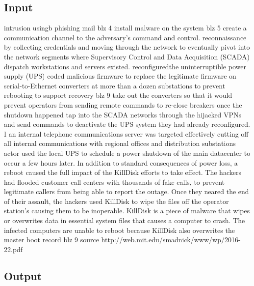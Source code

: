 \documentclass[11pt]{report}
\begin{document}
\subsection{Input}

intrusion usingb phishing mail blz  4
install malware on the system blz 5
create a communication channel to the adversary’s command and control.
reconnaissance by collecting credentials and moving through the network to eventually pivot into the network segments where Supervisory Control and Data Acquisition (SCADA) dispatch workstations and servers existed.
reconfiguredthe uninterruptible power supply (UPS)
coded malicious firmware to replace the legitimate firmware on serial-to-Ethernet converters at more than a dozen substations to prevent rebooting to support recovery blz 9
take out the converters so that it would prevent operators from sending remote commands to re-close breakers once the shutdown happened
tap into the SCADA networks through the hijacked VPNs and send commands to deactivate the UPS system they had already reconfigured. I
an internal telephone communications server was targeted effectively cutting off all internal communications with regional offices and distribution substations
actor used the local UPS to schedule a power shutdown of the main datacenter to occur a few hours later. In addition to standard consequences of power loss, a reboot caused the full impact of the KillDisk efforts to take effect.
The hackers had flooded customer call centers with thousands of fake calls, to prevent legitimate callers from being able to report the outage.
Once they neared the end of their assault, the hackers used KillDisk to wipe the files off the  operator station’s causing them to be inoperable. KillDisk is a piece of malware that wipes or  overwrites data in essential system files that causes a computer to crash. The infected computers are unable to reboot because KillDisk also overwrites the master boot record blz 9
source http://web.mit.edu/smadnick/www/wp/2016-22.pdf 


\subsection{Output}
\end{document}
